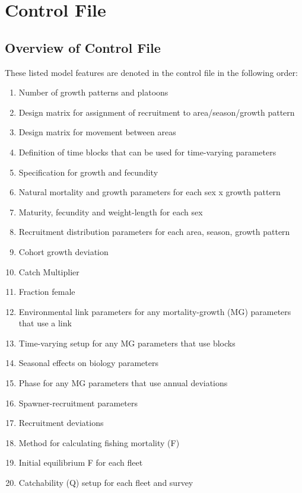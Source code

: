 \section{Control File}
\subsection{Overview of Control File}
These listed model features are denoted in the control file in the following order:
	\begin{enumerate}
		\item Number of growth patterns and platoons
		\item Design matrix for assignment of recruitment to area/season/growth pattern
		\item Design matrix for movement between areas
		\item Definition of time blocks that can be used for time-varying parameters
		\\
		\item Specification for growth and fecundity
		\item Natural mortality and growth parameters for each sex x growth pattern
		\item Maturity, fecundity and weight-length for each sex
		\item Recruitment distribution parameters for each area, season, growth pattern
		\item Cohort growth deviation
		\item Catch Multiplier
		\item Fraction female
		\item Environmental link parameters for any mortality-growth (MG) parameters that use a link
		\item Time-varying setup for any MG parameters that use blocks
		\item Seasonal effects on biology parameters
		\item Phase for any MG parameters that use annual deviations
		\\
		\item Spawner-recruitment parameters
		\item Recruitment deviations
		\\
		\item Method for calculating fishing mortality (F)
		\item Initial equilibrium F for each fleet
		\\
		\item Catchability (Q) setup for each fleet and survey

\end{enumerate}
